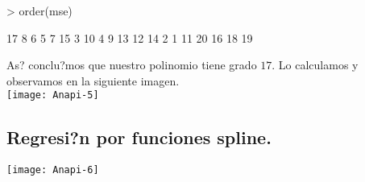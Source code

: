 \documentclass[a4paper, 12pt]{article}
\begin{document}
\begin{Schunk}
\begin{Sinput}
> order(mse)
\end{Sinput}
\begin{Soutput}
 [1] 17  8  6  5  7 15  3 10  4  9 13 12 14  2  1 11 20 16 18 19
\end{Soutput}
\end{Schunk}

As? conclu?mos que nuestro polinomio tiene grado $17$. Lo calculamos y observamos en la siguiente imagen. \\

\texttt{[image: Anapi-5]}


\medskip

\subsection{Regresi?n por funciones spline.}

\texttt{[image: Anapi-6]}
\end{document}
